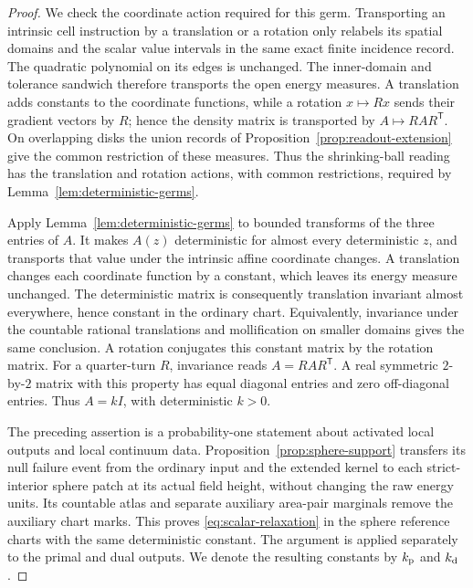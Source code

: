\begin{proof}
We check the coordinate action required for this germ.  Transporting an
intrinsic cell instruction by a translation or a rotation only relabels
its spatial domains and the scalar value intervals in the same exact
finite incidence record.  The quadratic polynomial on its edges is
unchanged.  The inner-domain and tolerance sandwich therefore transports
the open energy measures.  A translation adds constants to the coordinate
functions, while a rotation \(x\mapsto Rx\) sends their gradient vectors
by \(R\); hence the density matrix is transported by
\(A\mapsto RAR^{\mathsf T}\).  On overlapping disks the union records
of Proposition~\ref{prop:readout-extension} give the common restriction
of these measures.  Thus the shrinking-ball reading has the translation
and rotation actions, with common restrictions, required by
Lemma~\ref{lem:deterministic-germs}.

Apply Lemma~\ref{lem:deterministic-germs} to bounded transforms of the
three entries of \(A\).  It makes \(A(z)\) deterministic for almost every
deterministic \(z\), and transports that value under the intrinsic affine
coordinate changes.  A translation changes each coordinate function by
a constant, which leaves its energy measure unchanged.  The deterministic
matrix is consequently translation invariant almost everywhere, hence
constant in the ordinary chart.  Equivalently, invariance under the
countable rational translations and mollification on smaller domains
gives the same conclusion.  A rotation conjugates this constant matrix
by the rotation matrix.  For a quarter-turn \(R\), invariance reads
\(A=RAR^{\mathsf T}\).  A real symmetric \(2\)-by-\(2\) matrix with this
property has equal diagonal entries and zero off-diagonal entries.
Thus \(A=kI\), with deterministic \(k>0\).

The preceding assertion is a probability-one statement about activated
local outputs and local continuum data.  Proposition~\ref{prop:sphere-support}
transfers its null failure event from the ordinary input and the extended
kernel to each strict-interior sphere patch at its actual field height,
without changing the raw energy units.  Its countable atlas and separate
auxiliary area-pair marginals remove the auxiliary chart marks.  This
proves \eqref{eq:scalar-relaxation} in the sphere reference charts with
the same deterministic constant.  The argument is applied separately to
the primal and dual outputs.  We denote the resulting constants by
\(k_{\rm p}\) and \(k_{\rm d}\).
\end{proof}

